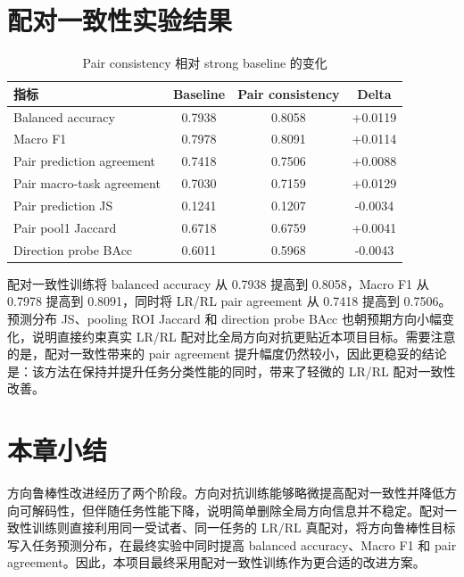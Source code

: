 \section{配对一致性实验结果}

\begin{table}[H]
  \centering
  \caption{配对一致性训练主结果（三个 initialization seed，共 15 个 fold-init）}
  \small
\end{table}

\begin{table}[H]
  \centering
  \caption{Pair consistency 相对 strong baseline 的变化}
  \small
  \begin{tabularx}{\linewidth}{>{\raggedright\arraybackslash}Xccc}
    \toprule
    指标 & Baseline & Pair consistency & Delta \\
    \midrule
    Balanced accuracy & 0.7938 & 0.8058 & +0.0119 \\
    Macro F1 & 0.7978 & 0.8091 & +0.0114 \\
    Pair prediction agreement & 0.7418 & 0.7506 & +0.0088 \\
    Pair macro-task agreement & 0.7030 & 0.7159 & +0.0129 \\
    Pair prediction JS & 0.1241 & 0.1207 & -0.0034 \\
    Pair pool1 Jaccard & 0.6718 & 0.6759 & +0.0041 \\
    Direction probe BAcc & 0.6011 & 0.5968 & -0.0043 \\
    \bottomrule
  \end{tabularx}
\end{table}

配对一致性训练将 balanced accuracy 从 0.7938 提高到 0.8058，Macro F1 从 0.7978 提高到 0.8091，同时将 LR/RL pair agreement 从 0.7418 提高到 0.7506。预测分布 JS、pooling ROI Jaccard 和 direction probe BAcc 也朝预期方向小幅变化，说明直接约束真实 LR/RL 配对比全局方向对抗更贴近本项目目标。需要注意的是，配对一致性带来的 pair agreement 提升幅度仍然较小，因此更稳妥的结论是：该方法在保持并提升任务分类性能的同时，带来了轻微的 LR/RL 配对一致性改善。

\section{本章小结}

方向鲁棒性改进经历了两个阶段。方向对抗训练能够略微提高配对一致性并降低方向可解码性，但伴随任务性能下降，说明简单删除全局方向信息并不稳定。配对一致性训练则直接利用同一受试者、同一任务的 LR/RL 真配对，将方向鲁棒性目标写入任务预测分布，在最终实验中同时提高 balanced accuracy、Macro F1 和 pair agreement。因此，本项目最终采用配对一致性训练作为更合适的改进方案。
